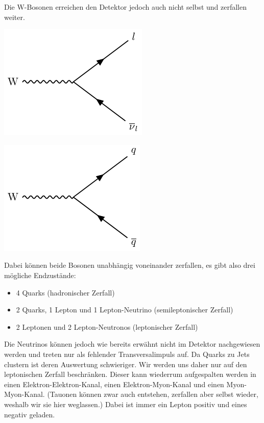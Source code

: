 Die W-Bosonen erreichen den Detektor jedoch auch nicht selbst und zerfallen weiter.
\begin{center}
  \begin{minipage}[t]{0.45\textwidth}
    \includegraphics{../Pictures/generate_feynman_Wlnu/Wlnu-feynman.pdf}
		\label{Wlnu}
  \end{minipage} \quad
  \begin{minipage}[t]{0.45\textwidth}
    \includegraphics{../Pictures/generate_feynman_Wqq/Wqq-feynman.pdf}
		\label{Wqq}
  \end{minipage}
\end{center}
Dabei können beide Bosonen unabhängig voneinander zerfallen, es gibt also drei mögliche Endzustände:
\begin{itemize}
  \item 4 Quarks (\glqq hadronischer Zerfall\grqq{})
  \item 2 Quarks, 1 Lepton und 1 Lepton-Neutrino (\glqq semileptonischer Zerfall\grqq{})
  \item 2 Leptonen und 2 Lepton-Neutronos (\glqq leptonischer Zerfall\grqq{})
\end{itemize}
Die Neutrinos können jedoch wie bereits erwähnt nicht im Detektor nachgewiesen werden und treten nur als fehlender Transversalimpuls auf.
Da Quarks zu Jets clustern ist deren Auswertung schwieriger.
Wir werden uns daher nur auf den leptonischen Zerfall beschränken.
Dieser kann wiederrum aufgespalten werden in einen Elektron-Elektron-Kanal, einen Elektron-Myon-Kanal und einen Myon-Myon-Kanal.
(Tauonen können zwar auch entstehen, zerfallen aber selbst wieder, weshalb wir sie hier weglassen.)
Dabei ist immer ein Lepton positiv und eines negativ geladen.

